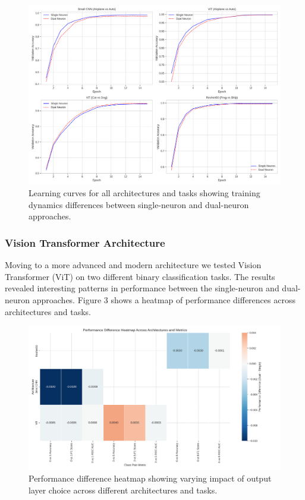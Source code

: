 \documentclass[11pt]{article}
\begin{document}
\begin{figure}[htbp]
\centering
\includegraphics[width=\textwidth]{figures/learning_curves.png}
\caption{Learning curves for all architectures and tasks showing training dynamics differences between single-neuron and dual-neuron approaches.}
\end{figure}

\subsubsection{Vision Transformer Architecture}
Moving to a more advanced and modern architecture we tested Vision Transformer (ViT) on two different binary classification tasks. The results revealed interesting patterns in performance between the single-neuron and dual-neuron approaches. Figure 3 shows a heatmap of performance differences across architectures and tasks.

\begin{figure}[htbp]
\centering
\includegraphics[width=\textwidth]{figures/performance_difference_heatmap.png}
\caption{Performance difference heatmap showing varying impact of output layer choice across different architectures and tasks.}
\end{figure}
\end{document}
